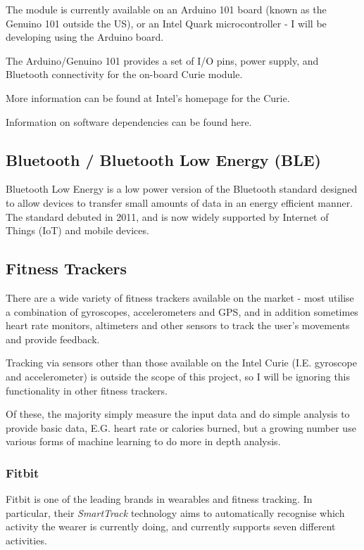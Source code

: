 \documentclass[a4paper]{article}
\begin{document}
The module is currently available on an Arduino 101 board (known as the Genuino 101 outside the US), or an Intel Quark microcontroller - I will be developing using the Arduino board.

The Arduino/Genuino 101 provides a set of I/O pins, power supply, and Bluetooth connectivity for the on-board Curie module.

More information can be found at Intel's homepage for the Curie\cite{bgref6}.

Information on software dependencies can be found here. 

\subsection{Bluetooth / Bluetooth Low Energy (BLE)}%

Bluetooth Low Energy\cite{bgref7} is a low power version of the Bluetooth standard designed to allow devices to transfer small amounts of data in an energy efficient manner. The standard debuted in 2011, and is now widely supported by Internet of Things (IoT) and mobile devices.

\subsection{Fitness Trackers}%

There are a wide variety of fitness trackers available on the market - most utilise a combination of gyroscopes, accelerometers and GPS, and in addition sometimes heart rate monitors, altimeters and other sensors to track the user's movements and provide feedback.

Tracking via sensors other than those available on the Intel Curie (I.E. gyroscope and accelerometer) is outside the scope of this project, so I will be ignoring this functionality in other fitness trackers.

Of these, the majority simply measure the input data and do simple analysis to provide basic data, E.G. heart rate or calories burned, but a growing number use various forms of machine learning to do more in depth analysis. 

\subsubsection{Fitbit}

Fitbit is one of the leading brands in wearables and fitness tracking. In particular, their \textit{SmartTrack}\cite{bgref8} technology aims to automatically recognise which activity the wearer is currently doing, and currently supports seven different activities.
\end{document}
